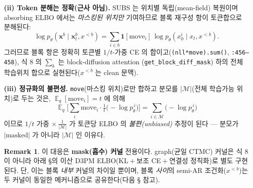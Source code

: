 \documentclass[11pt]{article}
\newcommand{\code}[1]{\texttt{\small #1}}
\newcommand{\pth}{p_\theta}
\newcommand{\xz}{x_0}
\newcommand{\xt}{x_t}
\newcommand{\xpre}{x^{<b}}
\newcommand{\bLM}{\mathcal{M}}
\DeclareMathOperator*{\E}{\mathbb{E}}
\theoremstyle{definition}
\newtheorem{remark}{Remark}
\begin{document}
\textbf{(ii) Token 분해는 정확(근사 아님).} SUBS 는 위치별 독립(mean-field) 복원이며
absorbing ELBO 에서는 \emph{마스킹된 위치만} 기여하므로 블록 재구성 항이 토큰합으로
분해된다:
\begin{equation}
\log\pth(\mathbf x^b\mid \mathbf x^b_t,\xpre)
=\sum_{i\in b}\mathbf 1[\text{move}_i]\,\log\pth(\xz^i\mid \xt,\xpre).
\end{equation}
그러므로 블록 항은 정확히 토큰별 $1/t$-가중 CE 의 합이고(\code{(nll*move).sum()},
\code{:456--458}), 식 8 의 $\sum_{b}$ 는 block-diffusion attention
(\code{get\_block\_diff\_mask}) 하의 전체 학습위치 합으로 실현된다($\xpre$ 는 clean 문맥).

\textbf{(iii) 정규화의 불편성.} \code{move}(마스킹 위치)로만 합하고 분모를
$|\bLM|$(전체 학습가능 위치)로 두는 것은, $\E_q[\text{move}_i]=t$ 에 의해
\begin{equation}
\E_q\!\Big[\textstyle\sum_{i}\text{move}_i\cdot\tfrac{1}{t}\big(-\log\pth^{\,i}\big)\Big]
=\sum_{i\in\bLM}\big(-\log\pth^{\,i}\big)
\end{equation}
이므로 $1/t$ 가중 $\times\,\tfrac{1}{|\bLM|}$ 가 토큰당 ELBO 의 \emph{불편(unbiased)}
추정이 된다 — 분모가 $|\text{masked}|$ 가 아니라 $|\bLM|$ 인 이유다.

\begin{remark}
이 대응은 \textbf{mask(흡수) 커널} 전용이다. graph(균일 CTMC) 커널은 식 8 이 아니라
아래 §의 이산 D3PM ELBO(KL${}+{}$보조 CE${}+{}$연결성 정칙화)로 별도 구현된다.
단, 이는 블록 \emph{내부} 커널의 차이일 뿐이며, 블록 \emph{사이}의 semi-AR
조건화($\xpre$)는 두 커널이 동일한 메커니즘으로 공유한다(다음 § 참고).
\end{remark}

\end{document}
